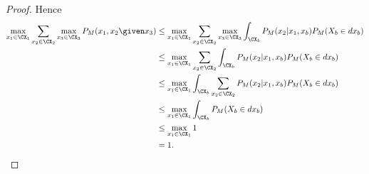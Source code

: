 \begin{proof}
  Hence
  \begin{equation*}\begin{split}
    \max_{x_1\in\CX_1} \sum_{x_2\in\CX_2} \max_{x_3\in\CX_3} P_M(x_1,x_2 \given x_3) 
    & \le \max_{x_1\in\CX_1} \sum_{x_2\in\CX_2} \max_{x_3\in\CX_3} \int_{\CX_b} P_M(x_2|x_1,x_b) P_M(X_b \in dx_b) \\
    & \le \max_{x_1\in\CX_1} \sum_{x_2\in\CX_2} \int_{\CX_b} P_M(x_2|x_1,x_b) P_M(X_b \in dx_b) \\
    & \le \max_{x_1\in\CX_1} \int_{\CX_b} \sum_{x_2\in\CX_2} P_M(x_2|x_1,x_b) P_M(X_b \in dx_b) \\
    & \le \max_{x_1\in\CX_1} \int_{\CX_b} P_M(X_b \in dx_b) \\
    & \le \max_{x_1\in\CX_1} 1 \\
    & = 1.
  \end{split}\end{equation*}
\end{proof}

